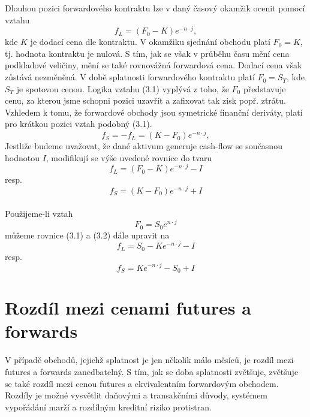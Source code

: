 \documentclass[a4paper]{book}
\begin{document}
Dlouhou pozici forwardového kontraktu lze v daný časový okamžik ocenit pomocí vztahu
\begin{equation}
f_L = (F_0 - K)e^{-n \cdot j},
\end{equation}
kde $K$ je dodací cena dle kontraktu.
V okamžiku sjednání obchodu platí $F_0 = K$, tj. hodnota kontraktu je nulová. S tím, jak se však v průběhu času mění cena podkladové veličiny, mění se také rovnovážná forwardová cena. Dodací cena však zůstává nezměněná.
V době splatnosti forwardového kontraktu platí $F_0 = S_T$, kde $S_T$ je spotovou cenou.
Logika vztahu (3.1) vyplývá z toho, že $F_0$ představuje cenu, za kterou jsme schopni pozici uzavřít a zafixovat tak zisk popř. ztrátu.\\
Vzhledem k tomu, že forwardové obchody jsou symetrické finanční deriváty, platí pro krátkou pozici vztah podobný (3.1).
\begin{equation}
f_S = -f_L = (K - F_0)e^{-n \cdot j},
\end{equation}
Jestliže budeme uvažovat, že dané aktivum generuje cash-flow se současnou hodnotou $I$, modifikují se výše uvedené rovnice do tvaru
\begin{equation*}
f_L =(F_0 - K)e^{-n \cdot j} - I
\end{equation*}
resp.
\begin{equation*}
f_S =(K - F_0)e^{-n \cdot j} + I
\end{equation*}\\
Použijeme-li vztah
\begin{equation*}
F_0 = S_0e^{n \cdot j}
\end{equation*}
můžeme rovnice (3.1) a (3.2) dále upravit na
\begin{equation*}
f_L = S_0 - Ke^{-n \cdot j} - I
\end{equation*}
resp.
\begin{equation*}
f_S = Ke^{-n \cdot j} - S_0 + I
\end{equation*}

\section{Rozdíl mezi cenami futures a forwards}

V případě obchodů, jejichž splatnost je jen několik málo měsíců, je rozdíl mezi futures a forwards zanedbatelný. S tím, jak se doba splatnosti zvětšuje, zvětšuje se také rozdíl mezi cenou futures a ekvivalentním forwardovým obchodem. Rozdíly je možné vysvětlit daňovými a transakčními důvody, systémem vypořádání marží a rozdílným kreditní riziko protistran.
\end{document}
